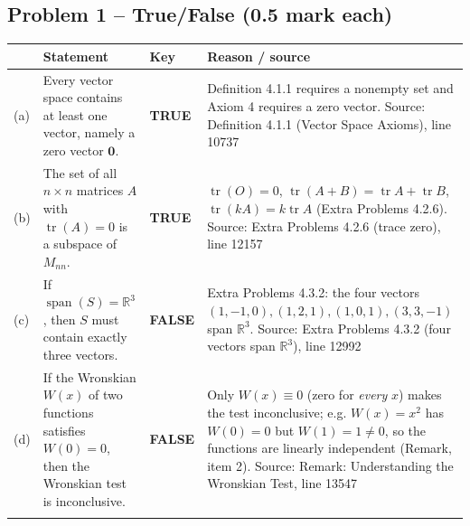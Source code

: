\documentclass[11pt,a4paper]{article}
\newcommand{\Src}[1]{{\footnotesize\color{black!65}Source: #1}}
\begin{document}
\subsection*{Problem 1 -- True/False (0.5 mark each)}
\begin{tabularx}{\linewidth}{@{}l >{\raggedright\arraybackslash}X l >{\raggedright\arraybackslash}X@{}}\toprule & Statement & Key & Reason / source\\\midrule
(a) & Every vector space contains at least one vector, namely a zero vector $\mathbf{0}$. & \textbf{TRUE} & Definition 4.1.1 requires a nonempty set and Axiom 4 requires a zero vector. \Src{Definition 4.1.1 (Vector Space Axioms), line 10737}\\\addlinespace
(b) & The set of all $n\times n$ matrices $A$ with $\operatorname{tr}(A)=0$ is a subspace of $M_{nn}$. & \textbf{TRUE} & $\operatorname{tr}(O)=0$, $\operatorname{tr}(A+B)=\operatorname{tr}A+\operatorname{tr}B$, $\operatorname{tr}(kA)=k\operatorname{tr}A$ (Extra Problems 4.2.6). \Src{Extra Problems 4.2.6 (trace zero), line 12157}\\\addlinespace
(c) & If $\operatorname{span}(S)=\mathbb{R}^3$, then $S$ must contain exactly three vectors. & \textbf{FALSE} & Extra Problems 4.3.2: the four vectors $(1,-1,0),(1,2,1),(1,0,1),(3,3,-1)$ span $\mathbb{R}^3$. \Src{Extra Problems 4.3.2 (four vectors span $\mathbb{R}^3$), line 12992}\\\addlinespace
(d) & If the Wronskian $W(x)$ of two functions satisfies $W(0)=0$, then the Wronskian test is inconclusive. & \textbf{FALSE} & Only $W(x)\equiv0$ (zero for \emph{every} $x$) makes the test inconclusive; e.g. $W(x)=x^2$ has $W(0)=0$ but $W(1)=1\neq0$, so the functions are linearly independent (Remark, item 2). \Src{Remark: Understanding the Wronskian Test, line 13547}\\\addlinespace
\bottomrule\end{tabularx}
\end{document}

